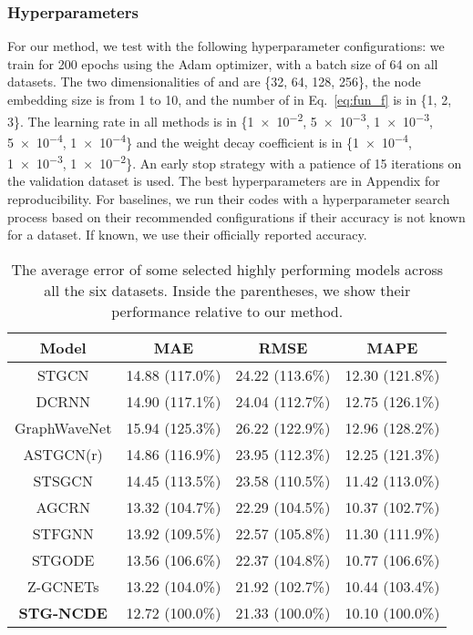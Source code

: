 \documentclass[letterpaper]{article} \usepackage{aaai22}  \usepackage{times}  \usepackage{helvet}  \usepackage{courier}  \usepackage[hyphens]{url}  \usepackage{graphicx} \urlstyle{rm} \def\UrlFont{\rm}  \usepackage{natbib}  \usepackage{caption} \DeclareCaptionStyle{ruled}{labelfont=normalfont,labelsep=colon,strut=off} \frenchspacing  \setlength{\pdfpagewidth}{8.5in}  \setlength{\pdfpageheight}{11in}  \usepackage{stfloats}
\begin{document}
\subsubsection{Hyperparameters}
For our method, we test with the following hyperparameter configurations: we train for 200 epochs using the Adam optimizer, with a batch size of 64 on all datasets. The two dimensionalities of  and  are \{32, 64, 128, 256\}, the node embedding size  is from 1 to 10, and the number of  in Eq.~\eqref{eq:fun_f} is in \{1, 2, 3\}.  The learning rate in all methods is in \{\num{1e-2}, \num{5e-3}, \num{1e-3}, \num{5e-4}, \num{1e-4}\} and the weight decay coefficient is in \{\num{1e-4}, \num{1e-3}, \num{1e-2}\}. An early stop strategy with a patience of 15 iterations on the validation dataset is used. The best hyperparameters are in Appendix for reproducibility. For baselines, we run their codes with a hyperparameter search process based on their recommended configurations if their accuracy is not known for a dataset. If known, we use their officially reported accuracy.


\begin{table}[t]
\small
    \setlength{\tabcolsep}{2pt}
    \centering
    \begin{tabular}{c ccc}
    \hline
        Model                &   MAE                 &   RMSE                &  MAPE\\\hline
        STGCN                & 14.88 (117.0\%)       & 24.22 (113.6\%)       & 12.30 (121.8\%)\\
        DCRNN                & 14.90 (117.1\%)       & 24.04 (112.7\%)       & 12.75 (126.1\%)\\
        GraphWaveNet         & 15.94 (125.3\%)       & 26.22 (122.9\%)       & 12.96 (128.2\%) \\
        ASTGCN(r)            & 14.86 (116.9\%)       & 23.95 (112.3\%)       & 12.25 (121.3\%) \\
        STSGCN               & 14.45 (113.5\%)       & 23.58 (110.5\%)       & 11.42 (113.0\%) \\
        AGCRN                & 13.32 (104.7\%)       & 22.29 (104.5\%)       & 10.37 (102.7\%) \\
        STFGNN               & 13.92 (109.5\%)       & 22.57 (105.8\%)       & 11.30 (111.9\%) \\
        STGODE               & 13.56 (106.6\%)       & 22.37 (104.8\%)       & 10.77 (106.6\%) \\
        Z-GCNETs             & 13.22 (104.0\%)       & 21.92 (102.7\%)       & 10.44 (103.4\%) \\\hline
        \textbf{STG-NCDE}    & 12.72 (100.0\%)       & 21.33 (100.0\%)       & 10.10 (100.0\%)\\
    \hline
    \end{tabular}
    \caption{The average error of some selected highly performing models across all the six datasets. Inside the parentheses, we show their performance relative to our method.}
    \label{tab:average}
\end{table}
\end{document}
